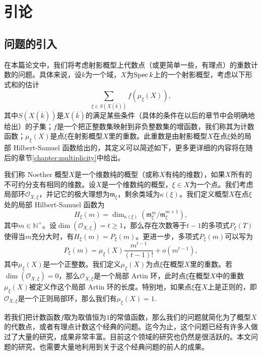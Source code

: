 \chapter{引论}
\label{introduction}

\section{问题的引入}
\label{history}

在本篇论文中，我们将考虑射影概型上代数点（或更简单一些，有理点）的重数计数的问题。具体来说，设$k$为一个域，$X$为$\operatorname{Spec} k$上的一个射影概型，考虑以下形式和的估计
\begin{equation}
\sum_{\xi \in S(X(\overline{k}))} f\left(\mu_{\xi}(X)\right),
\end{equation}
其中$S(X(\overline{k}))$是$X(\overline{k})$的满足某些条件（具体的条件在以后的章节中会明确地给出）的子集；$f$是一个把正整数集映射到非负整数集的增函数，我们称其为计数函数；$\mu_{\xi}(X)$是点$\xi$在射影概型$X$里的重数。此重数是由射影概型$X$在点$\xi$处的局部 Hilbert-Samuel 函数给出的，其定义可以简述如下，更多更详细的内容将在随后的章节\ref{chapter:multiplicity}中给出。

我们称 Noether 概型$X$是一个维数纯的概型（或称$X$有纯的维数），如果$X$所有的不可约分支有相同的维数。设$X$是一个维数纯的概型，$\xi \in X$为一个点。我们考虑局部环$\mathcal{O}_{X,\xi}$，并记它的极大理想为$\mathfrak{m}_{\xi}$，剩余类域为$\kappa(\xi)$。我们定义概型$X$在点$\xi$处的局部 Hilbert-Samuel 函数为
\begin{equation}
H_{\xi}(m) = \dim_{\kappa(\xi)} \left(\mathfrak{m}_{\xi}^m/\mathfrak{m}_{\xi}^{m+1}\right),
\end{equation}
其中$m \in \mathbb{N}^+$。设$\dim(\mathcal{O}_{X,\xi}) = t \geqslant 1$，那么存在次数等于$t-1$的多项式$P_{\xi}(T)$使得当$m$充分大时，有$H_{\xi}(m) = P_{\xi}(m)$。更进一步，多项式$P_{\xi}(m)$可以写为
\begin{equation} \label{local Hilbert-Samuel}
P_{\xi}(m) = \mu_{\xi}(X) \frac{m^{t-1}}{(t-1)!} + o(m^{t-1}),
\end{equation}
其中$\mu_\xi(X)$是一个正整数。我们定义$\mu_\xi(X)$为点$\xi$在概型$X$里的重数。若$\dim(\mathcal{O}_{X,\xi}) = 0$，那么$\mathcal{O}_{X,\xi}$是一个局部 Artin 环，此时点$\xi$在概型$X$中的重数$\mu_{\xi}(X)$被定义作这个局部 Artin 环的长度。特别地，如果点$\xi$在$X$上是正则的，即$\mathcal{O}_{X,\xi}$是一个正则局部环，那么我们有$\mu_{\xi}(X) = 1.$

若我们把计数函数$f$取为取值恒为$1$的常值函数，那么我们的问题就简化为了概型$X$的代数点，或者有理点计数这个经典的问题。迄今为止，这个问题已经有许多人做过了大量的研究，成果非常丰富。目前这个领域的研究也仍然是很活跃的。本文问题的研究，也需要大量地利用到关于这个经典问题的前人的成果。

